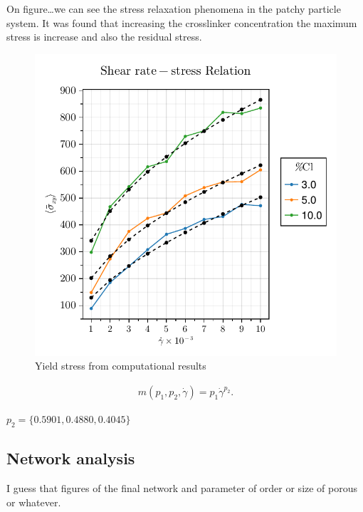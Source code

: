 On figure\ldots we can see the stress relaxation phenomena in the patchy particle system.
It was found that increasing the crosslinker concentration the maximum stress is increase and also the residual stress.

\newpage



\begin{figure}[ht!]
    \centering
    \includegraphics[width=\textwidth]{figs/ComputaitonalResults/yieldStress.pdf}
    \caption{Yield stress from computational results}\label{fig:yieldStressResults}
\end{figure}

\begin{gather}
    m(p_1,p_2,\dot{\gamma}) = p_1\dot{\gamma}^{p_2}.
\end{gather}

$p_2 = \{0.5901,0.4880,0.4045\}$

\subsection{Network analysis}

I guess that figures of the final network and parameter of order or size of porous or whatever.

